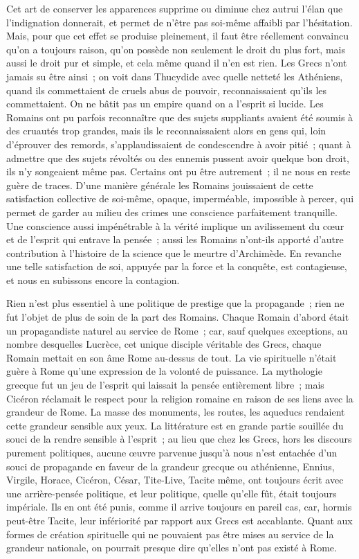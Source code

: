 \documentclass[french,twoside]{book} %
\begin{document}
Cet art de conserver les apparences supprime ou diminue chez autrui l'élan que l'indignation donnerait, et permet de n'être pas soi-même affaibli par l'hésitation. Mais, pour que cet effet se produise pleinement, il faut être réellement convaincu qu'on a toujours raison, qu'on possède non seulement le droit du plus fort, mais aussi le droit pur et simple, et cela même quand il n'en est rien. Les Grecs n'ont jamais su être ainsi ; on voit dans Thucydide avec quelle netteté les Athéniens, quand ils commettaient de cruels abus de pouvoir, reconnaissaient qu'ils les commettaient. On ne bâtit pas un empire quand on a l'esprit si lucide. Les Romains ont pu parfois reconnaître que des sujets suppliants avaient été soumis à des cruautés trop grandes, mais ils le reconnaissaient alors en gens qui, loin d'éprouver des remords, s'applaudis­saient de condescendre à avoir pitié ; quant à admettre que des sujets révoltés ou des ennemis pussent avoir quelque bon droit, ils n'y songeaient même pas. Certains ont pu être autrement ; il ne nous en reste guère de traces. D'une manière générale les Romains jouissaient de cette satisfaction collective de soi-même, opaque, imperméable, impossible à percer, qui permet de garder au milieu des crimes une conscience parfaitement tranquille. Une conscience aussi impénétrable à la vérité implique un avilissement du cœur et de l'esprit qui entrave la pensée ; aussi les Romains n'ont-ils apporté d'autre contribution à l'histoire de la science que le meurtre d'Archimède. En revanche une telle satisfaction de soi, appuyée par la force et la conquête, est contagieuse, et nous en subissons encore la contagion.\par
Rien n'est plus essentiel à une politique de prestige que la propagande ; rien ne fut l'objet de plus de soin de la part des Romains. Chaque Romain d'abord était un propagandiste naturel au service de Rome ; car, sauf quelques exceptions, au nombre desquelles Lucrèce, cet unique disciple véritable des Grecs, chaque Romain mettait en son âme Rome au-dessus de tout. La vie spirituelle n'était guère à Rome qu'une expression de la volonté de puissance. La mythologie grecque fut un jeu de l'esprit qui laissait la pensée entièrement libre ; mais Cicéron réclamait le respect pour la religion romaine en raison de ses liens avec la grandeur de Rome. La masse des monuments, les routes, les aqueducs rendaient cette grandeur sensible aux yeux. La littérature est en grande partie souillée du souci de la rendre sensible à l'esprit ; au lieu que chez les Grecs, hors les discours purement politiques, aucune œuvre parvenue jusqu'à nous n'est entachée d'un souci de propagande en faveur de la grandeur grecque ou athénienne, Ennius, Virgile, Horace, Cicéron, César, Tite-Live, Tacite même, ont toujours écrit avec une arrière-pensée politique, et leur poli­tique, quelle qu'elle fût, était toujours impériale. Ils en ont été punis, comme il arrive toujours en pareil cas, car, hormis peut-être Tacite, leur infériorité par rapport aux Grecs est accablante. Quant aux formes de création spirituelle qui ne pouvaient pas être mises au service de la grandeur nationale, on pourrait presque dire qu'elles n'ont pas existé à Rome.\par
\end{document}
